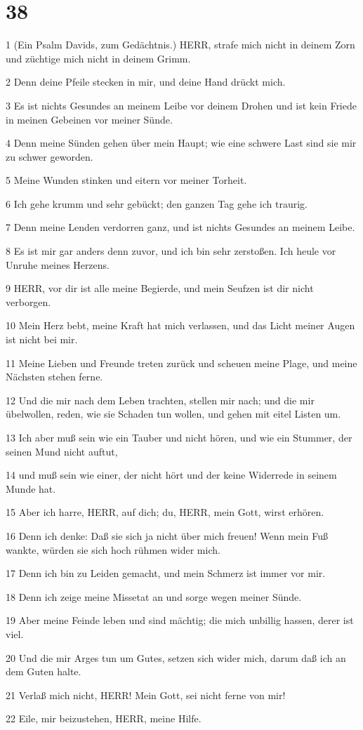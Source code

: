 \chapter{38}

\par 1 (Ein Psalm Davids, zum Gedächtnis.) HERR, strafe mich nicht in deinem Zorn und züchtige mich nicht in deinem Grimm.
\par 2 Denn deine Pfeile stecken in mir, und deine Hand drückt mich.
\par 3 Es ist nichts Gesundes an meinem Leibe vor deinem Drohen und ist kein Friede in meinen Gebeinen vor meiner Sünde.
\par 4 Denn meine Sünden gehen über mein Haupt; wie eine schwere Last sind sie mir zu schwer geworden.
\par 5 Meine Wunden stinken und eitern vor meiner Torheit.
\par 6 Ich gehe krumm und sehr gebückt; den ganzen Tag gehe ich traurig.
\par 7 Denn meine Lenden verdorren ganz, und ist nichts Gesundes an meinem Leibe.
\par 8 Es ist mir gar anders denn zuvor, und ich bin sehr zerstoßen. Ich heule vor Unruhe meines Herzens.
\par 9 HERR, vor dir ist alle meine Begierde, und mein Seufzen ist dir nicht verborgen.
\par 10 Mein Herz bebt, meine Kraft hat mich verlassen, und das Licht meiner Augen ist nicht bei mir.
\par 11 Meine Lieben und Freunde treten zurück und scheuen meine Plage, und meine Nächsten stehen ferne.
\par 12 Und die mir nach dem Leben trachten, stellen mir nach; und die mir übelwollen, reden, wie sie Schaden tun wollen, und gehen mit eitel Listen um.
\par 13 Ich aber muß sein wie ein Tauber und nicht hören, und wie ein Stummer, der seinen Mund nicht auftut,
\par 14 und muß sein wie einer, der nicht hört und der keine Widerrede in seinem Munde hat.
\par 15 Aber ich harre, HERR, auf dich; du, HERR, mein Gott, wirst erhören.
\par 16 Denn ich denke: Daß sie sich ja nicht über mich freuen! Wenn mein Fuß wankte, würden sie sich hoch rühmen wider mich.
\par 17 Denn ich bin zu Leiden gemacht, und mein Schmerz ist immer vor mir.
\par 18 Denn ich zeige meine Missetat an und sorge wegen meiner Sünde.
\par 19 Aber meine Feinde leben und sind mächtig; die mich unbillig hassen, derer ist viel.
\par 20 Und die mir Arges tun um Gutes, setzen sich wider mich, darum daß ich an dem Guten halte.
\par 21 Verlaß mich nicht, HERR! Mein Gott, sei nicht ferne von mir!
\par 22 Eile, mir beizustehen, HERR, meine Hilfe.

